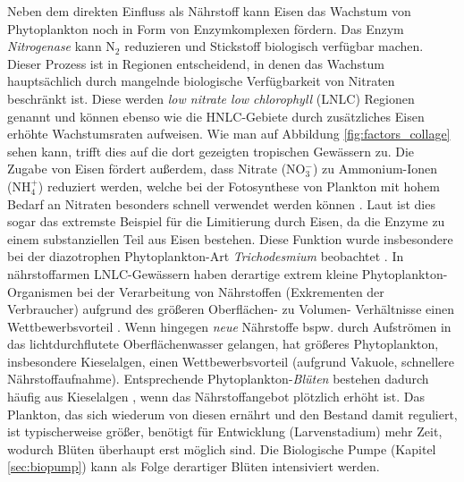 \documentclass[12pt,a4paper,onecolumn]{scrartcl}
\begin{document}
Neben dem direkten Einfluss als Nährstoff kann Eisen das Wachstum von Phytoplankton noch in Form von Enzymkomplexen fördern. Das Enzym \textit{Nitrogenase} kann N$_2$ reduzieren und Stickstoff biologisch verfügbar machen. Dieser Prozess ist in Regionen entscheidend, in denen das Wachstum hauptsächlich durch mangelnde biologische Verfügbarkeit von Nitraten beschränkt ist. Diese werden \textit{low nitrate low chlorophyll} (LNLC) Regionen genannt und können ebenso wie die HNLC-Gebiete durch zusätzliches Eisen erhöhte Wachstumsraten aufweisen. Wie man auf Abbildung \ref{fig:factors_collage} sehen kann, trifft dies auf die dort gezeigten tropischen Gewässern zu. Die Zugabe von Eisen fördert außerdem, dass Nitrate (NO$_3^-$) zu Ammonium-Ionen (NH$_4^+$) reduziert werden, welche bei der Fotosynthese von Plankton mit hohem Bedarf an Nitraten besonders schnell verwendet werden können \citep{Emerson.2009}. Laut \citet{Emerson.2009} ist dies sogar das extremste Beispiel für die Limitierung durch Eisen, da die Enzyme zu einem substanziellen Teil aus Eisen bestehen. Diese Funktion wurde insbesondere bei der diazotrophen Phytoplankton-Art \textit{Trichodesmium} beobachtet \citep{Falkowski.1998}. In nährstoffarmen LNLC-Gewässern haben derartige extrem kleine Phytoplankton-Organismen bei der Verarbeitung von Nährstoffen (Exkrementen der Verbraucher) aufgrund des größeren Oberflächen- zu Volumen- Verhältnisse einen Wettbewerbsvorteil \citep{Falkowski.1998}. Wenn hingegen \textit{neue} Nährstoffe bspw. durch Aufströmen in das lichtdurchflutete Oberflächenwasser gelangen, hat größeres Phytoplankton, insbesondere Kieselalgen, einen Wettbewerbsvorteil (aufgrund Vakuole, schnellere Nährstoffaufnahme). Entsprechende Phytoplankton-\textit{Blüten} bestehen dadurch häufig aus Kieselalgen \citep{Boyd.2007}, wenn das Nährstoffangebot plötzlich erhöht ist. Das Plankton, das sich wiederum von diesen ernährt und den Bestand damit reguliert, ist typischerweise größer, benötigt für Entwicklung (Larvenstadium) mehr Zeit, wodurch Blüten überhaupt erst möglich sind. Die Biologische Pumpe (Kapitel \ref{sec:biopump}) kann als Folge derartiger Blüten intensiviert werden. 
\end{document}
